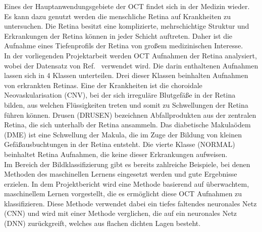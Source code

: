 Eines der Hauptanwendungsgebiete der OCT findet sich in der Medizin wieder. Es kann dazu genutzt werden die menschliche Retina auf Krankheiten zu untersuchen. Die Retina besitzt eine komplizierte, mehrschichtige Struktur und Erkrankungen der Retina können in jeder Schicht auftreten. Daher ist die Aufnahme eines Tiefenprofils der Retina von großem medizinischen Interesse. \\
In der vorliegenden Projektarbeit werden OCT Aufnahmen der Retina analysiert, wobei der Datensatz von Ref.~\cite{Dataset} verwendet wird. Die darin enthaltenen Aufnahmen lassen sich in 4 Klassen unterteilen. Drei dieser Klassen beinhalten Aufnahmen von erkrankten Retinas. Eine der Krankheiten ist die choroidale Neovaskularisation (CNV), bei der sich irreguläre Blutgefäße in der Retina bilden, aus welchen Flüssigkeiten treten und somit zu Schwellungen der Retina führen können. Drusen (DRUSEN) bezeichnen Abfallprodukten aus der zentralen Retina, die sich unterhalb der Retina ansammeln. Das diabetische Makulaödem (DME) ist eine Schwellung der Makula, die im Zuge der Bildung von kleinen Gefäßausbuchtungen in der Retina entsteht. Die vierte Klasse (NORMAL) beinhaltet Retina Aufnahmen, die keine dieser Erkrankungen aufweisen. \\
Im Bereich der Bildklassifizierung gibt es bereits zahlreiche Beispiele, bei denen Methoden des maschinellen Lernens eingesetzt werden und gute Ergebnisse erzielen. In dem Projektbericht wird eine Methode basierend auf überwachtem, maschinellem Lernen vorgestellt, die es ermöglicht diese OCT Aufnahmen zu klassifizieren. Diese Methode verwendet dabei ein tiefes faltendes neuronales Netz (CNN) und wird mit einer Methode verglichen, die auf ein neuronales Netz (DNN) zurückgreift, welches aus flachen dichten Lagen besteht. 